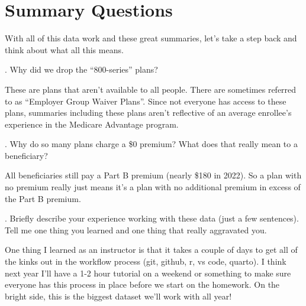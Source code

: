 \documentclass[
  letterpaper,
  DIV=11,
  numbers=noendperiod]{scrartcl}
\begin{document}
\newpage

\section{Summary Questions}\label{summary-questions}

With all of this data work and these great summaries, let's take a step
back and think about what all this means.

\vspace{.2in}

. Why did we drop the ``800-series'' plans?

These are plans that aren't available to all people. There are sometimes
referred to as ``Employer Group Waiver Plans''. Since not everyone has
access to these plans, summaries including these plans aren't reflective
of an average enrollee's experience in the Medicare Advantage program.

\newpage

. Why do so many plans charge a \$0 premium? What does that
really mean to a beneficiary?

All beneficiaries still pay a Part B premium (nearly \$180 in 2022). So
a plan with no premium really just means it's a plan with no additional
premium in excess of the Part B premium.

\newpage

. Briefly describe your experience working with these data
(just a few sentences). Tell me one thing you learned and one thing that
really aggravated you.

One thing I learned as an instructor is that it takes a couple of days
to get all of the kinks out in the workflow process (git, github, r, vs
code, quarto). I think next year I'll have a 1-2 hour tutorial on a
weekend or something to make sure everyone has this process in place
before we start on the homework. On the bright side, this is the biggest
dataset we'll work with all year!
\end{document}
